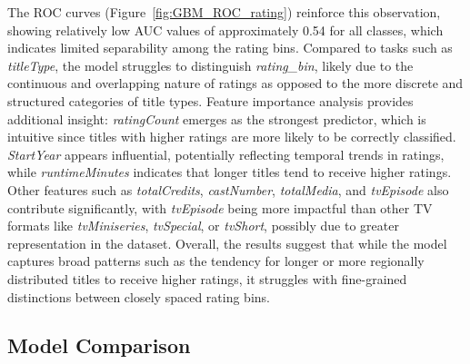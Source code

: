 The ROC curves (Figure~\ref{fig:GBM_ROC_rating}) reinforce this observation, 
showing relatively low AUC values of approximately 0.54 for all classes, which indicates limited 
separability among the rating bins. Compared to tasks such as \textit{titleType}, the model struggles to distinguish \textit{rating\_bin}, 
likely due to the continuous and overlapping nature of ratings as opposed to the more discrete and structured categories of title types. 
Feature importance analysis provides additional insight: \textit{ratingCount} emerges as the strongest predictor, 
which is intuitive since titles with higher ratings are more likely to be correctly classified. 
\textit{StartYear} appears influential, potentially reflecting temporal trends in ratings, 
while \textit{runtimeMinutes} indicates that longer titles tend to receive higher ratings. 
Other features such as \textit{totalCredits}, \textit{castNumber}, \textit{totalMedia}, and \textit{tvEpisode} also contribute significantly, 
with \textit{tvEpisode} being more impactful than other TV formats like \textit{tvMiniseries}, \textit{tvSpecial}, or \textit{tvShort}, 
possibly due to greater representation in the dataset.
Overall, the results suggest that while the model captures broad patterns such as the tendency for longer or more regionally distributed titles to receive higher ratings, 
it struggles with fine-grained distinctions between closely spaced rating bins. 



\subsection{Model Comparison}